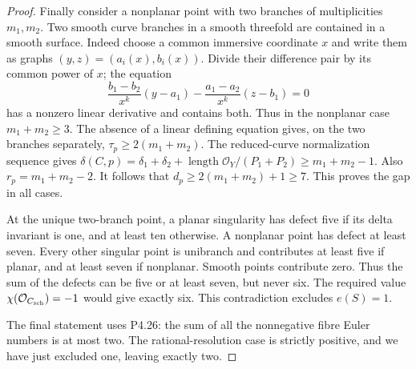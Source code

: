 \begin{proof}
Finally consider a nonplanar point with two branches
of multiplicities $m_1,m_2$. Two smooth curve branches
in a smooth threefold are contained in a smooth
surface. Indeed choose a common immersive coordinate
$x$ and write them as graphs
$(y,z)=(a_i(x),b_i(x))$. Divide their difference pair
by its common power of $x$; the equation
\[
 \frac{b_1-b_2}{x^k}(y-a_1)
 -\frac{a_1-a_2}{x^k}(z-b_1)=0
\]
has a nonzero linear derivative and contains both.
Thus in the nonplanar case $m_1+m_2\ge3$.
The absence of a linear defining equation gives,
on the two branches separately,
$\tau_p\ge2(m_1+m_2)$.
The reduced-curve normalization sequence gives
$\delta(C,p)=\delta_1+\delta_2+
\operatorname{length}\mathcal O_Y/(P_1+P_2)
\ge m_1+m_2-1$.
Also $r_p=m_1+m_2-2$.
It follows that
$d_p\ge2(m_1+m_2)+1\ge7$.
This proves the gap in all cases.

At the unique two-branch point, a planar singularity
has defect five if its delta invariant is one, and
at least ten otherwise. A nonplanar point has defect
at least seven. Every other singular point is
unibranch and contributes at least five if planar,
and at least seven if nonplanar. Smooth points
contribute zero. Thus the sum of the defects can
be five or at least seven, but never six.
The required value $\chi(\mathcal O_{C_{\rm sch}})=-1$
would give exactly six. This contradiction excludes
$e(S)=1$.

The final statement uses P4.26: the sum of all the
nonnegative fibre Euler numbers is at most two.
The rational-resolution case is strictly positive,
and we have just excluded one, leaving exactly two.
\end{proof}
